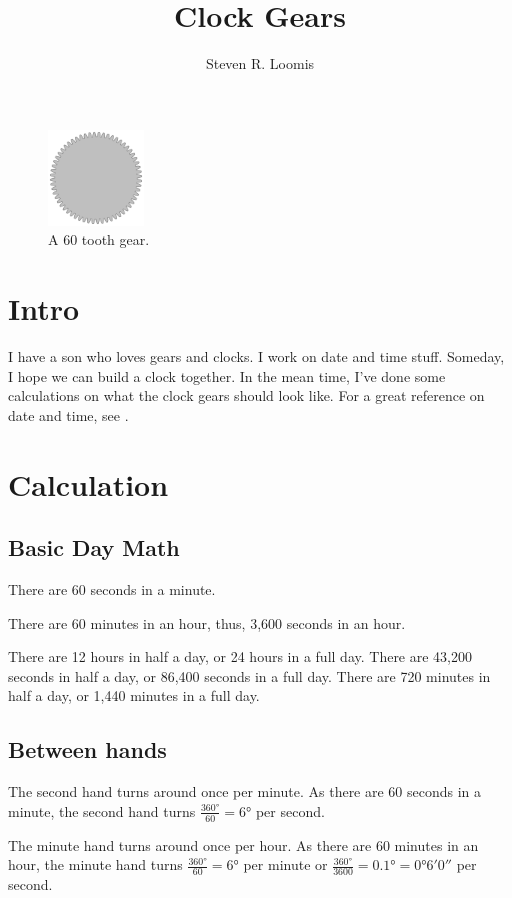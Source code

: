 \documentclass[11pt]{amsart}
\title{Clock Gears}
\author{Steven R. Loomis}
\date{}                                           %
\begin{document}
\maketitle

\begin{figure}[h!]
  \caption{A 60 tooth gear.}
  \centering
\includegraphics[width=1in]{gear.pdf}
\end{figure}

\section{Intro}

I have a son who loves gears and clocks.  I work on date and time stuff. Someday, I hope we can build a clock together. In the mean time,
I've done some calculations on what the clock gears should look like. For a great reference on date and time, see .

\section{Calculation}

\subsection{Basic Day Math}

There are 60 seconds in a minute.

There are 60 minutes in an hour, thus, 3,600 seconds in an hour.

There are 12 hours in half a day, or 24 hours in a full day.
There are 43,200 seconds in half a day, or 86,400 seconds in a full day.
There are 720 minutes in half a day, or 1,440 minutes in a full day.

\subsection{Between hands}

The second hand turns around once per minute. As there are 60 seconds in a minute, the second hand turns \( \frac{ \ang{360} }{60} = \ang{6} \)  per second.

The minute hand turns around once per hour. As there are 60 minutes in an hour, the minute hand turns  \( \frac{ \ang{360} }{60} = \ang{6} \)  per minute or 
  \( \frac{ \ang{360} }{3600} = \ang{0.1} = \ang{0;6;0} \) per second. 
\end{document}
